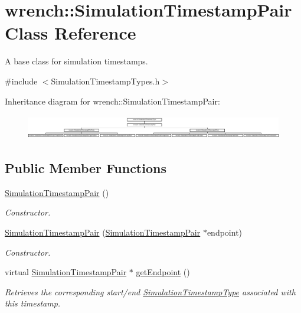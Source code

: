 \hypertarget{classwrench_1_1_simulation_timestamp_pair}{}\section{wrench\+:\+:Simulation\+Timestamp\+Pair Class Reference}
\label{classwrench_1_1_simulation_timestamp_pair}


A base class for simulation timestamps.  




{\ttfamily \#include $<$Simulation\+Timestamp\+Types.\+h$>$}

Inheritance diagram for wrench\+:\+:Simulation\+Timestamp\+Pair\+:\begin{figure}[H]
\begin{center}
\leavevmode
\includegraphics[height=1.081081cm]{classwrench_1_1_simulation_timestamp_pair}
\end{center}
\end{figure}
\subsection*{Public Member Functions}
\begin{DoxyCompactItemize}
\item 
\mbox{\label{classwrench_1_1_simulation_timestamp_pair_aac98d2588e217c72fe1fd7019a22f416}} 
\hyperlink{classwrench_1_1_simulation_timestamp_pair_aac98d2588e217c72fe1fd7019a22f416}{Simulation\+Timestamp\+Pair} ()
\begin{DoxyCompactList}\small\item\em Constructor. \end{DoxyCompactList}\item 
\hyperlink{classwrench_1_1_simulation_timestamp_pair_adff0fb043b6129c02d979de6234c6f60}{Simulation\+Timestamp\+Pair} (\hyperlink{classwrench_1_1_simulation_timestamp_pair}{Simulation\+Timestamp\+Pair} $\ast$endpoint)
\begin{DoxyCompactList}\small\item\em Constructor. \end{DoxyCompactList}\item 
virtual \hyperlink{classwrench_1_1_simulation_timestamp_pair}{Simulation\+Timestamp\+Pair} $\ast$ \hyperlink{classwrench_1_1_simulation_timestamp_pair_aa47d05297b863c29179a505ea4e5dfdf}{get\+Endpoint} ()
\begin{DoxyCompactList}\small\item\em Retrieves the corresponding start/end \hyperlink{classwrench_1_1_simulation_timestamp_type}{Simulation\+Timestamp\+Type} associated with this timestamp. \end{DoxyCompactList}\end{DoxyCompactItemize}
